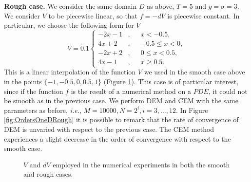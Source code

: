 \vspace{2mm}
\noindent\textbf{Rough case.} We consider the same domain $D$ as above, $T = 5$ and $g = \sigma = 3$. We consider $V$ to be piecewise linear, so that $f = -dV$ is piecewise constant. In particular, we choose the following form for $V$
\begin{equation}\label{eq:FunctionsOneDRough}
V = 0.1 
\left \{
\begin{aligned}
	 -2x -1&, && x < -0.5, \\
	 4x + 2&, && -0.5 \leq x < 0, \\
	 -2x + 2&, &&  0 \leq x < 0.5, \\
	 4x - 1&, && x \geq 0.5.
\end{aligned} \right .
\end{equation}
This is a linear interpolation of the function $V$ we used in the smooth case above in the points $\{-1,-0.5,0,0.5,1\}$ (Figure \ref{fig:PlotsVSmoothRough}). This case is of particular interest, since if the function $f$ is the result of a numerical method on a $PDE$, it could not be smooth as in the previous case. We perform DEM and CEM with the same parameters as before, \textit{i.e.}, $M = 10000, N = 2^i,i=3,\dots,12$. In Figure \ref{fig:OrdersOneDRough} it is possible to remark that the rate of convergence of DEM is unvaried with respect to the previous case. The CEM method experiences a slight decrease in the order of convergence with respect to the smooth case.

\begin{figure}[t]
        \centering
        \resizebox{0.6\linewidth}{!}{ }  
        \caption{$V$ and $dV$ employed in the numerical experiments in both the smooth and rough cases.}
        \label{fig:PlotsVSmoothRough}
\end{figure}


